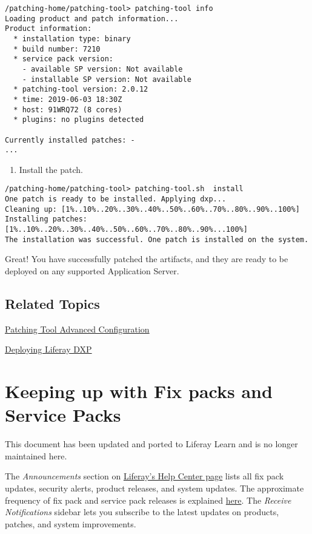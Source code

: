 \begin{verbatim}
/patching-home/patching-tool> patching-tool info
Loading product and patch information...
Product information:
  * installation type: binary
  * build number: 7210
  * service pack version:
    - available SP version: Not available
    - installable SP version: Not available
  * patching-tool version: 2.0.12
  * time: 2019-06-03 18:30Z
  * host: 91WRQ72 (8 cores)
  * plugins: no plugins detected

Currently installed patches: -
...
\end{verbatim}

\begin{enumerate}
\def\labelenumi{\arabic{enumi}.}
\setcounter{enumi}{4}
\tightlist
\item
  Install the patch.
\end{enumerate}

\begin{verbatim}
/patching-home/patching-tool> patching-tool.sh  install
One patch is ready to be installed. Applying dxp...
Cleaning up: [1%..10%..20%..30%..40%..50%..60%..70%..80%..90%..100%]
Installing patches: [1%..10%..20%..30%..40%..50%..60%..70%..80%..90%...100%]
The installation was successful. One patch is installed on the system.
\end{verbatim}

Great! You have successfully patched the artifacts, and they are ready
to be deployed on any supported Application Server.

\section{Related Topics}\label{related-topics-9}

\href{/docs/7-2/deploy/-/knowledge_base/d/patching-tool-advanced-configuration}{Patching
Tool Advanced Configuration}

\href{/docs/7-2/deploy/-/knowledge_base/d/deploying-product}{Deploying
Liferay DXP}

\chapter{Keeping up with Fix packs and Service
Packs}\label{keeping-up-with-fix-packs-and-service-packs}

{This document has been updated and ported to Liferay Learn and is no
longer maintained here.}

The \emph{Announcements} section on
\href{https://help.liferay.com/hc}{Liferay's Help Center page} lists all
fix pack updates, security alerts, product releases, and system updates.
The approximate frequency of fix pack and service pack releases is
explained
\href{/docs/7-2/deploy/-/knowledge_base/d/patching-basics}{here}. The
\emph{Receive Notifications} sidebar lets you subscribe to the latest
updates on products, patches, and system improvements.

